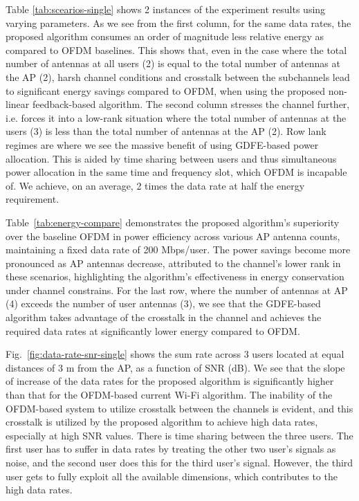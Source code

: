 Table \ref{tab:scearios-single} shows 2 instances of the experiment results using varying parameters. As we see from the first column, for the same data rates, the proposed algorithm consumes an order of magnitude less relative energy as compared to OFDM baselines. This shows that, even in the case where the total number of antennas at all users (2) is equal to the total number of antennas at the AP (2), harsh channel conditions and crosstalk between the subchannels lead to significant energy savings compared to OFDM, when using the proposed non-linear feedback-based algorithm. The second column stresses the channel further, i.e. forces it into a low-rank situation where the total number of antennas at the users (3) is less than the total number of antennas at the AP (2). Row lank regimes are where we see the massive benefit of using GDFE-based power allocation. This is aided by time sharing between users and thus simultaneous power allocation in the same time and frequency slot, which OFDM is incapable of. We achieve, on an average, 2 times the data rate at half the energy requirement.

Table~\ref{tab:energy-compare} demonstrates the proposed algorithm's superiority over the baseline OFDM in power efficiency across various AP antenna counts, maintaining a fixed data rate of 200 Mbps/user. The power savings become more pronounced as AP antennas decrease, attributed to the channel's lower rank in these scenarios, highlighting the algorithm's effectiveness in energy conservation under channel constrains. For the last row, where the number of antennas at AP (4) exceeds the number of user antennas (3), we see that the GDFE-based algorithm takes advantage of the crosstalk in the channel and achieves the required data rates at significantly lower energy compared to OFDM. 

Fig.~\ref{fig:data-rate-snr-single} shows the sum rate across 3 users located at equal distances of 3 m from the AP, as a function of SNR (dB). We see that the slope of increase of the data rates for the proposed algorithm is significantly higher than that for the OFDM-based current Wi-Fi algorithm. The inability of the OFDM-based system to utilize crosstalk between the channels is evident, and this crosstalk is utilized by the proposed algorithm to achieve high data rates, especially at high SNR values. There is time sharing between the three users. The first user has to suffer in data rates by treating the other two user's signals as noise, and the second user does this for the third user's signal. However, the third user gets to fully exploit all the available dimensions, which contributes to the high data rates. 


